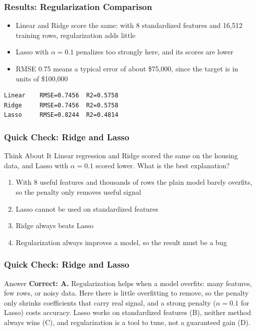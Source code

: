 \begin{frame}[fragile]\frametitle{Results: Regularization Comparison}
\begin{itemize}
\item Linear and Ridge score the same: with 8 standardized features and 16,512 training rows, regularization adds little
\item Lasso with $\alpha = 0.1$ penalizes too strongly here, and its scores are lower
\item RMSE 0.75 means a typical error of about \$75,000, since the target is in units of \$100,000
\end{itemize}
\begin{lstlisting}
Linear    RMSE=0.7456  R2=0.5758
Ridge     RMSE=0.7456  R2=0.5758
Lasso     RMSE=0.8244  R2=0.4814
\end{lstlisting}
\end{frame}

\begin{frame}[fragile]\frametitle{Quick Check: Ridge and Lasso}
\begin{block}{Think About It}
Linear regression and Ridge scored the same on the housing data, and Lasso with $\alpha = 0.1$ scored lower. What is the best explanation?
\begin{enumerate}
  \item[A.] With 8 useful features and thousands of rows the plain model barely overfits, so the penalty only removes useful signal
  \item[B.] Lasso cannot be used on standardized features
  \item[C.] Ridge always beats Lasso
  \item[D.] Regularization always improves a model, so the result must be a bug
\end{enumerate}
\end{block}
\end{frame}

\begin{frame}[fragile]\frametitle{Quick Check: Ridge and Lasso}
\begin{block}{Answer}
\textbf{Correct: A.} Regularization helps when a model overfits: many features, few rows, or noisy data. Here there is little overfitting to remove, so the penalty only shrinks coefficients that carry real signal, and a strong penalty ($\alpha = 0.1$ for Lasso) costs accuracy. Lasso works on standardized features (B), neither method always wins (C), and regularization is a tool to tune, not a guaranteed gain (D).
\end{block}
\end{frame}